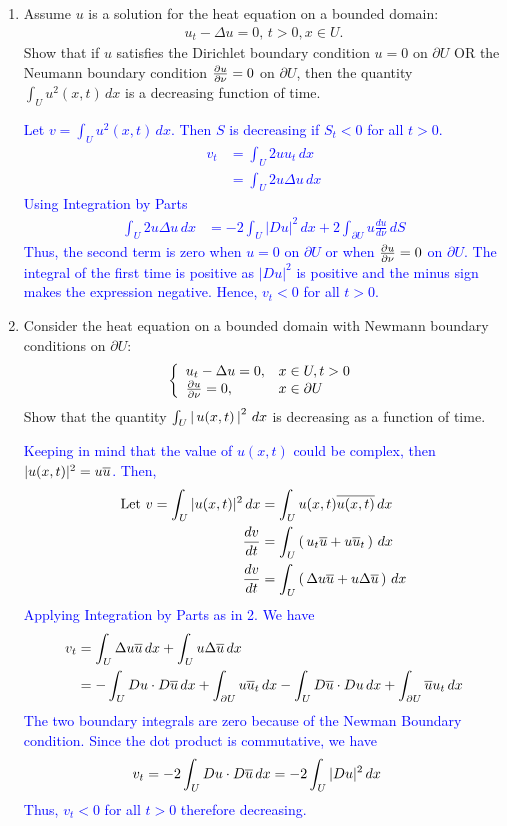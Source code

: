 \documentclass[10pt,a4paper]{report}
\newcommand{\BLUE}[1]{\textcolor{blue}{#1}}
\begin{document}
\begin{enumerate}
\item Assume $u$ is a solution for the heat equation on a bounded domain:
\begin{align*}
	u_t-\Delta u=0,\, t>0, x\in U.
\end{align*}Show that if $u$ satisfies the Dirichlet boundary condition $u=0$ on $\partial U$ OR the Neumann boundary condition $\frac{\partial u}{\partial \nu}=0$ on $\partial U$, then the quantity $\int_U u^2(x,t)\,dx$ is a decreasing function of time.

\BLUE{Let $v=\int_U u^2(x,t)\,dx$.  Then $S$ is decreasing if $S_t<0$ for all $t>0$.
	\begin{align*}
		v_t &= \int_U 2uu_t \,dx \\
		&= \int_U 2u\Delta u\, dx
	\end{align*}Using Integration by Parts
	\begin{align*}
		\int_U 2u\Delta u\, dx &= -2\int_U |Du|^2\,dx +2 \int_{\partial U} u\frac{du}{d\nu}\, dS
	\end{align*}Thus, the second term is zero when $u=0$ on $\partial U$ or when $\frac{\partial u}{\partial \nu}=0$ on $\partial U$.  The integral of the first time is positive as $|Du|^2$ is positive and the minus sign makes the expression negative.  Hence, $v_t< 0$ for all $t>0$.
}

\item Consider the heat equation on a bounded domain with Newmann boundary conditions on $\partial U$:
\begin{align*}
	\left \{ \begin{array}{ll} u_t-\Delta u=0, & x \in U, t>0\\ \frac{\partial u}{\partial \nu}=0,& x \in \partial U \end{array} \right .
\end{align*}Show that the quantity $\int_U\left |\, u(x,t) \,\right |^2\,dx$ is decreasing as a function of time.

\BLUE{Keeping in mind that the value of $u(x,t)$ could be complex, then $|u(x,t)|^2 = u\overline{u}$.  Then,
\begin{align*}
	\text{Let } v = \int_U|u(x,t)|^2\,dx &= \int_U u(x,t)\overline{u(x,t)}\, dx \\
	\frac{dv}{dt} &= \int_U \left (\, u_t\overline{u} + u\overline{u}_t \,\right )\, dx \\
	\frac{dv}{dt} &= \int_U \left (\, \Delta u\overline{u} + u\Delta \overline{u} \,\right )\, dx 
\end{align*}Applying Integration by Parts as in 2.  We have
\begin{align*}
	v_t &= \int_U \Delta u\overline{u}\,dx + \int_U u\Delta \overline{u}\, dx \\
	&= -\int_U Du\cdot D\overline{u} \,dx + \int_{\partial U} u\overline{u}_t\, dx - \int_U D\overline{u}\cdot Du \,dx + \int_{\partial U} \overline{u}u_t\, dx
\end{align*}The two boundary integrals are zero because of the Newman Boundary condition.  Since the dot product is commutative, we have
\begin{align*}
	v_t &= -2\int_U Du\cdot D\overline{u} \,dx = -2\int_U |Du|^2 \, dx 
\end{align*}Thus, $v_t < 0$ for all $t>0$ therefore decreasing.
}


\end{enumerate}
\end{document}
